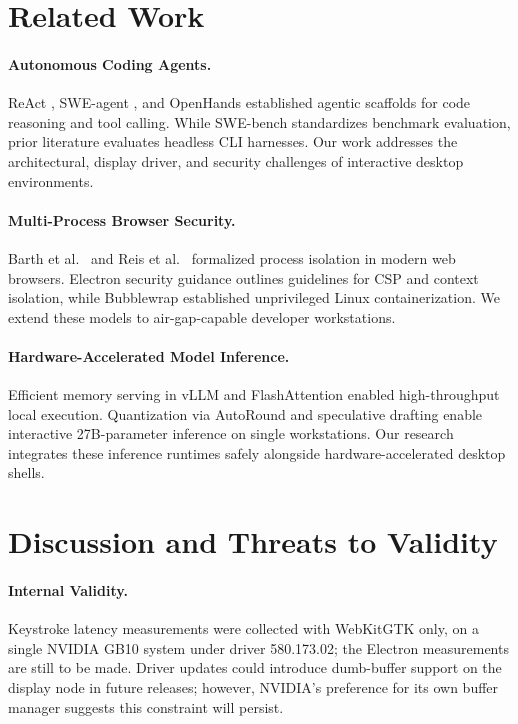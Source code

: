 \documentclass[11pt]{article}
\begin{document}
\section{Related Work}
\label{sec:related-work}

\paragraph{Autonomous Coding Agents.} ReAct \cite{yao2023react}, SWE-agent \cite{yang2024sweagent}, and OpenHands
\cite{wang2024openhands} established agentic scaffolds for code reasoning and tool calling. While SWE-bench
\cite{jimenez2024swebench} standardizes benchmark evaluation, prior literature evaluates headless CLI harnesses.
Our work addresses the architectural, display driver, and security challenges of interactive desktop environments.

\paragraph{Multi-Process Browser Security.} Barth et al.\ \cite{barth2008browser} and Reis et al.\ \cite{reis2019siteisolation}
formalized process isolation in modern web browsers. Electron security guidance \cite{electron2026security} outlines
guidelines for CSP and context isolation, while Bubblewrap \cite{bubblewrap2024} established unprivileged Linux containerization.
We extend these models to air-gap-capable developer workstations.

\paragraph{Hardware-Accelerated Model Inference.} Efficient memory serving in vLLM \cite{kwon2023vllm} and FlashAttention
\cite{dao2022flashattention,dao2023flashattention2} enabled high-throughput local execution. Quantization via AutoRound
\cite{cheng2023autoround} and speculative drafting \cite{leviathan2023speculative,chen2026dflash} enable interactive
27B-parameter inference on single workstations. Our research integrates these inference runtimes safely alongside
hardware-accelerated desktop shells.

\section{Discussion and Threats to Validity}
\label{sec:threats}

\paragraph{Internal Validity.} Keystroke latency measurements were collected with WebKitGTK only, on a single NVIDIA
GB10 system under driver 580.173.02; the Electron measurements are still to be made. Driver updates could introduce
dumb-buffer support on the display node in future releases; however, NVIDIA's preference for its own buffer manager
suggests this constraint will persist.
\end{document}
